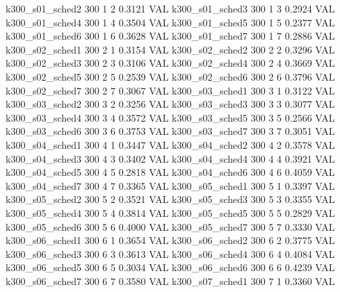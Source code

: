   k300_s01_sched2                  300    1   2    0.3121  VAL
  k300_s01_sched3                  300    1   3    0.2924  VAL
  k300_s01_sched4                  300    1   4    0.3504  VAL
  k300_s01_sched5                  300    1   5    0.2377  VAL
  k300_s01_sched6                  300    1   6    0.3628  VAL
  k300_s01_sched7                  300    1   7    0.2886  VAL
  k300_s02_sched1                  300    2   1    0.3154  VAL
  k300_s02_sched2                  300    2   2    0.3296  VAL
  k300_s02_sched3                  300    2   3    0.3106  VAL
  k300_s02_sched4                  300    2   4    0.3669  VAL
  k300_s02_sched5                  300    2   5    0.2539  VAL
  k300_s02_sched6                  300    2   6    0.3796  VAL
  k300_s02_sched7                  300    2   7    0.3067  VAL
  k300_s03_sched1                  300    3   1    0.3122  VAL
  k300_s03_sched2                  300    3   2    0.3256  VAL
  k300_s03_sched3                  300    3   3    0.3077  VAL
  k300_s03_sched4                  300    3   4    0.3572  VAL
  k300_s03_sched5                  300    3   5    0.2566  VAL
  k300_s03_sched6                  300    3   6    0.3753  VAL
  k300_s03_sched7                  300    3   7    0.3051  VAL
  k300_s04_sched1                  300    4   1    0.3447  VAL
  k300_s04_sched2                  300    4   2    0.3578  VAL
  k300_s04_sched3                  300    4   3    0.3402  VAL
  k300_s04_sched4                  300    4   4    0.3921  VAL
  k300_s04_sched5                  300    4   5    0.2818  VAL
  k300_s04_sched6                  300    4   6    0.4059  VAL
  k300_s04_sched7                  300    4   7    0.3365  VAL
  k300_s05_sched1                  300    5   1    0.3397  VAL
  k300_s05_sched2                  300    5   2    0.3521  VAL
  k300_s05_sched3                  300    5   3    0.3355  VAL
  k300_s05_sched4                  300    5   4    0.3814  VAL
  k300_s05_sched5                  300    5   5    0.2829  VAL
  k300_s05_sched6                  300    5   6    0.4000  VAL
  k300_s05_sched7                  300    5   7    0.3330  VAL
  k300_s06_sched1                  300    6   1    0.3654  VAL
  k300_s06_sched2                  300    6   2    0.3775  VAL
  k300_s06_sched3                  300    6   3    0.3613  VAL
  k300_s06_sched4                  300    6   4    0.4084  VAL
  k300_s06_sched5                  300    6   5    0.3034  VAL
  k300_s06_sched6                  300    6   6    0.4239  VAL
  k300_s06_sched7                  300    6   7    0.3580  VAL
  k300_s07_sched1                  300    7   1    0.3360  VAL
